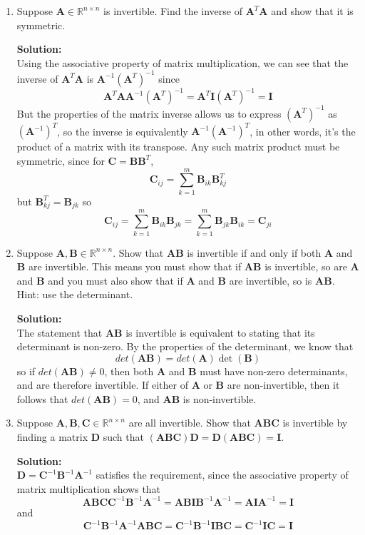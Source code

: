 \documentclass[]{article}
\newcommand{\R}{\mathbb{R}}				%
\newcommand{\A}{\bm{A}}					%
\newcommand{\I}{\bm{I}}					%
\newcommand{\solution}{\vskip 0.5cm \textbf{\large Solution:} \\}
\begin{document}
\begin{enumerate}
\begin{enumerate}
	  \end{enumerate}
	  
	\item Suppose $\A\in\R^{n\times n}$ is invertible. Find the inverse of $\A^T\A$ and show that it is symmetric.

	  \solution
	  Using the associative property of matrix multiplication, we can see that the inverse of $\A^T\A$ is $\A^{-1}(\A^T)^{-1}$ since
      \[
      \A^T \A \A^{-1}(\A^T)^{-1} = \A^T \I (\A^T)^{-1} = \I
      \]
      But the properties of the matrix inverse allows us to express
      $(\A^T)^{-1}$ as $(\A^{-1})^T$, so the inverse is equivalently
      $\A^{-1}(\A^{-1})^T$, in other words, it's the product of a matrix
      with its transpose. Any such matrix product must be symmetric,
      since for $\bm{C} = \bm{B}\bm{B}^T$,
      \[
      \bm{C}_{ij} = \sum_{k=1}^{m} \bm{B}_{ik} \bm{B}^T_{kj}
      \]
      but $\bm{B}^T_{kj} = \bm{B}_{jk}$ so
      \[
      \bm{C}_{ij} = \sum_{k=1}^{m} \bm{B}_{ik} \bm{B}_{jk} = \sum_{k=1}^{m} \bm{B}_{jk} \bm{B}_{ik} = \bm{C}_{ji}
      \]


	\item Suppose $\A,\bm{B}\in\R^{n\times n}$. Show that $\bm{AB}$ is invertible if and only if both $\A$ and $\bm{B}$ are invertible. This means you must show that if $\bm{AB}$ is invertible, so are $\A$ and $\bm{B}$ and you must also show that if $\A$ and $\bm{B}$ are invertible, so is $\bm{AB}$. Hint: use the determinant.

	  \solution

      The statement that $\A\bm{B}$ is invertible is equivalent to
      stating that its determinant is non-zero. By the properties of
      the determinant, we know that $$det(\A \bm{B}) = det(\A)
      \det(\bm{B})$$ so if $det(\A\bm{B}) \neq 0$, then both $\A$ and
      $\bm{B}$ must have non-zero determinants, and are therefore
      invertible. If either of $\A$ or $\bm{B}$ are non-invertible,
      then it follows that $det(\A\bm{B}) = 0$, and $\A\bm{B}$ is
      non-invertible.

	\item Suppose $\A,\bm{B},\bm{C}\in\R^{n\times n}$ are all invertible. Show that $\bm{ABC}$ is invertible by finding a matrix $\bm{D}$ such that $(\bm{ABC})\bm{D}=\bm{D}(\bm{ABC})=\bm{I}$.

	  \solution

      $\bm{D} = \bm{C}^{-1} \bm{B}^{-1} \A^{-1}$ satisfies the
      requirement, since the associative property of matrix
      multiplication shows that
      $$ \bm{ABC}\bm{C}^{-1} \bm{B}^{-1} \A^{-1} = \bm{ABI} \bm{B}^{-1} \A^{-1} = \bm{AI} \A^{-1} = \I $$
      and
      $$ \bm{C}^{-1} \bm{B}^{-1} \A^{-1} \bm{ABC} = \bm{C}^{-1} \bm{B}^{-1} \bm{IBC} = \bm{C}^{-1} \bm{IC} = \I $$
      

\end{enumerate}
\end{document}
